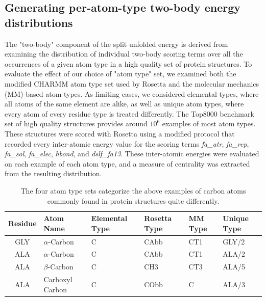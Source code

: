 \subsection{Generating per-atom-type two-body energy distributions}
The "two-body" component of the split unfolded energy is derived from examining the distribution of individual two-body scoring terms over all the occurrences of a given atom type in a high quality set of protein structures.
To evaluate the effect of our choice of "atom type" set, we examined both the modified CHARMM atom type set used by Rosetta\cite{leaver-fay_chapter_2011,bernard_charmm_1983} and the molecular mechanics (MM)-based atom types\cite{renfrew_incorporation_2012}. %
As limiting cases, we considered elemental types, where all atoms of the same element are alike, as well as unique atom types, where every atom of every residue type is treated differently.
The Top8000 benchmark set of high quality structures\cite{lovell_structure_2003} provides around $10^6$ examples of most atom types. These structures were scored with Rosetta using a modified protocol that recorded every inter-atomic energy value for the scoring terms \textit{fa\_atr}, \textit{fa\_rep}, \textit{fa\_sol}, \textit{fa\_elec}, \textit{hbond}, and \textit{dslf\_fa13}.
These inter-atomic energies were evaluated on each example of each atom type, and a measure of centrality was extracted from the resulting distribution.

\begin{table}
  \centering
  \caption{The four atom type sets categorize the above examples of carbon atoms commonly found in protein structures quite differently.}
  \label{tab:atypes_example}
  \begin{tabular}{clllll}
    \toprule
    Residue & Atom Name & Elemental Type & Rosetta Type & MM Type & Unique Type\\
    \midrule
    GLY & $\alpha$-Carbon & C & CAbb & CT1 & GLY/2\\
    ALA & $\alpha$-Carbon & C & CAbb & CT1 & ALA/2\\
    ALA & $\beta$-Carbon & C & CH3 & CT3 & ALA/5\\
    ALA & Carboxyl Carbon & C & CObb & C & ALA/3\\
    \bottomrule
  \end{tabular}
\end{table}

